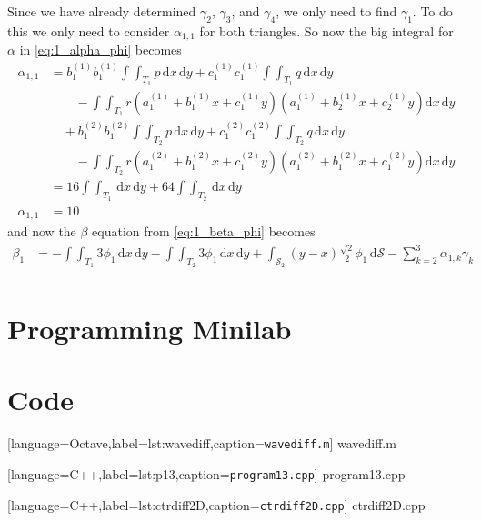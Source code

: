 \documentclass[12pt]{article}
\newcommand{\dd}[1]{\mathrm{d}{#1}}
\begin{document}
Since we have already determined $\gamma_2$, $\gamma_3$, and $\gamma_4$,
we only need to find $\gamma_1$. To do this we only need to consider
$\alpha_{1,1}$ for both triangles. So now the big integral for $\alpha$
in \cref{eq:1_alpha_phi} becomes
\begin{equation}
  \label{eq:1_alpha_1_1_nophi}
  \begin{aligned}
    \alpha_{1,1}&=
    b_1^{(1)}b_1^{(1)}\int\int_{T_1} p\, \dd{x}\,\dd{y} +
    c_1^{(1)}c_1^{(1)}\int\int_{T_1} q\, \dd{x}\,\dd{y} \\ &\qquad-
    \int\int_{T_1} r (a_1^{(1)} + b_1^{(1)}x + c_1^{(1)}y)(a_1^{(1)} +
    b_2^{(1)}x + c_2^{(1)}y) \dd{x}\,\dd{y} \\ &\quad+ 
    b_1^{(2)}b_1^{(2)}\int\int_{T_2} p\, \dd{x}\,\dd{y} +
    c_1^{(2)}c_1^{(2)}\int\int_{T_2} q\, \dd{x}\,\dd{y} \\ &\qquad-
    \int\int_{T_2} r(a_1^{(2)} + b_1^{(2)}x + c_1^{(2)}y)(a_1^{(2)} +
    b_1^{(2)}x + c_1^{(2)}y)\dd{x}\,\dd{y} \\
    &=16\int\int_{T_1} \, \dd{x}\,\dd{y} +
    64\int\int_{T_2} \, \dd{x}\,\dd{y} \\
    \alpha_{1,1}&=10
  \end{aligned}
\end{equation}
and now the $\beta$ equation from \cref{eq:1_beta_phi} becomes
\begin{equation}
  \label{eq:1_beta_1_values}
  \begin{aligned}
    \beta_1 &= -\int\int_{T_1}3\phi_1 \,\dd{x}\,\dd{y} -
    \int\int_{T_2}3\phi_1 \,\dd{x}\,\dd{y} +
    \int_{\mathcal{S}_2}
    (y-x)\frac{\sqrt{2}}{2}\phi_1\,
    \dd{\mathcal{S}} -
    \sum_{k=2}^{3}\alpha_{1,k}\gamma_{k}\\
  \end{aligned}
\end{equation}

\section{Programming Minilab}
\pagebreak
\section{Code}

[language=Octave,label=lst:wavediff,caption=\texttt{wavediff.m}]
{wavediff.m}
\pagebreak

[language=C++,label=lst:p13,caption=\texttt{program13.cpp}]
{program13.cpp}
\pagebreak

[language=C++,label=lst:ctrdiff2D,caption=\texttt{ctrdiff2D.cpp}]
{ctrdiff2D.cpp}
\end{document}
